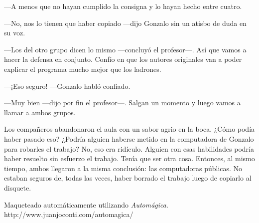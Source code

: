 \documentclass[12pt,twoside,openright]{book}
\begin{document}
---A menos que no hayan cumplido la consigna y lo hayan hecho entre cuatro.

---No, nos lo tienen que haber copiado ---dijo Gonzalo sin un atisbo de duda en su voz.

---Los del otro grupo dicen lo mismo ---concluyó el profesor---. Así que vamos a hacer la defensa en conjunto. Confío en que los autores originales van a poder explicar el programa mucho mejor que los ladrones.

---¡Eso seguro! ---Gonzalo habló confiado.

---Muy bien ---dijo por fin el profesor---. Salgan un momento y luego vamos a llamar a ambos grupos.

Los compañeros abandonaron el aula con un sabor agrio en la boca. ¿Cómo podía haber pasado eso? ¿Podría alguien haberse metido en la computadora de Gonzalo para robarles el trabajo? No, eso era ridículo. Alguien con esas habilidades podría haber resuelto sin esfuerzo el trabajo. Tenía que ser otra cosa. Entonces, al mismo tiempo, ambos llegaron a la misma conclusión: las computadoras públicas. No estaban seguros de, todas las veces, haber borrado el trabajo luego de copiarlo al disquete.



\cleardoublepage

%

\hspace{0pt}
\vfill
\begin{center}
Maqueteado automáticamente utilizando \emph{Automágica}.
\bigbreak
http://www.juanjoconti.com/automagica/
\end{center}
\vfill
\hspace{0pt}
\end{document}
